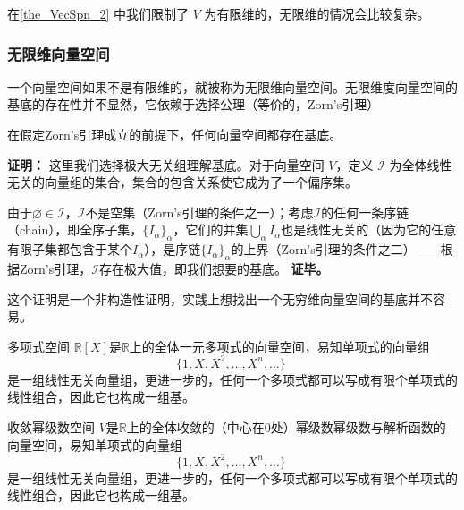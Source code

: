 在\autoref{the_VecSpn_2} 中我们限制了 $V$ 为有限维的，无限维的情况会比较复杂。

\subsubsection{无限维向量空间}

一个向量空间如果不是有限维的，就被称为无限维向量空间。无限维度向量空间的基底的存在性并不显然，它依赖于选择公理（等价的，Zorn's引理）

\begin{theorem}{}
在假定Zorn's引理成立的前提下，任何向量空间都存在基底。
\end{theorem}
\textbf{证明：}
这里我们选择极大无关组理解基底。对于向量空间 $V$，定义 $\mathcal{I}$ 为全体线性无关的向量组的集合，集合的包含关系使它成为了一个偏序集。


由于$\varnothing \in \mathcal{I}$，$\mathcal{I}$不是空集（Zorn's引理的条件之一）；考虑$\mathcal{I}$的任何一条序链（chain），即全序子集，$\{I_\alpha\}_\alpha$，它们的并集$\bigcup_\alpha I_\alpha$也是线性无关的（因为它的任意有限子集都包含于某个$I_\alpha$），是序链$\{I_\alpha\}_\alpha$的上界（Zorn's引理的条件之二）——根据Zorn's引理，$\mathcal{I}$存在极大值，即我们想要的基底。
\textbf{证毕。}

这个证明是一个非构造性证明，实践上想找出一个无穷维向量空间的基底并不容易。

\begin{example}{多项式空间}
$\mathbb{R}[X]$是$\mathbb{R}$上的全体一元多项式的向量空间，易知单项式的向量组
\begin{equation}
\{1, X, X^2, \dots, X^n, \dots\}~
\end{equation}
是一组线性无关向量组，更进一步的，任何一个多项式都可以写成有限个单项式的线性组合，因此它也构成一组基。
\end{example}

\begin{example}{收敛幂级数空间}
$V$是$\mathbb{R}$上的全体收敛的（中心在$0$处）幂级数幂级数与解析函数的向量空间，易知单项式的向量组
\begin{equation}
\{1, X, X^2, \dots, X^n, \dots\}~
\end{equation}
是一组线性无关向量组，更进一步的，任何一个多项式都可以写成有限个单项式的线性组合，因此它也构成一组基。
\end{example}



